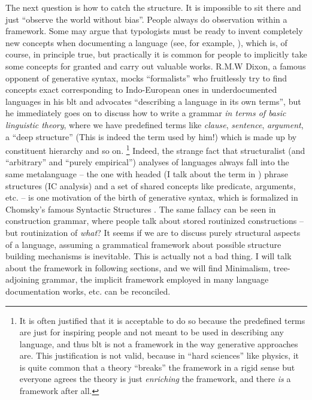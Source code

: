\documentclass[../main.tex]{subfiles}
\begin{document}
The next question is how to catch the structure. It is impossible to sit there and just ``observe the world without bias''. People always do observation within a 
framework. Some may argue that typologists must be ready to invent completely new concepts when documenting 
a language (see, for example, \citet{haspelmath2008framework}), which is, of course, in principle true, 
but practically it is common for people to implicitly take some concepts for granted and carry out 
valuable works. R.M.W Dixon, a famous opponent of generative syntax, mocks ``formalists'' who fruitlessly try 
to find concepts exact corresponding to Indo-European ones in underdocumented languages in his 
\ac{blt} \citep{dixon2009basic} and advocates ``describing a language in its own terms'',
but he immediately goes on to discuss how to write a grammar \emph{in terms of basic linguistic theory},
where we have predefined terms like \emph{clause}, \emph{sentence}, \emph{argument}, a ``deep structure''
(This is indeed the term used by him!) which is made up by constituent hierarchy and so on. %
\footnote{
    It is often justified that it is acceptable to do so because the predefined terms are just for inspiring 
    people and not meant to be used in describing any language, and thus \ac{blt} is not a framework in the way generative approaches are. This justification is not valid, because in 
    ``hard sciences'' like physics, it is quite common that a theory ``breaks'' the framework in a rigid sense 
    but everyone agrees the theory is just \emph{enriching} the framework, and there \emph{is} a framework after all.
}%
Indeed, the strange fact that structuralist (and ``arbitrary'' and ``purely empirical'') analyses of 
languages always fall into the same metalanguage -- the one with headed (I talk about the term in 
) phrase structures (IC analysis) and a set of shared concepts like predicate, 
arguments, etc. -- is one motivation of the birth of generative syntax, which is formalized in Chomsky's 
famous Syntactic Structures \citep{chomsky2009syntactic}. The same fallacy can be seen in construction grammar,
where people talk about stored routinized constructions -- but routinization of \emph{what}? 
It seems if we are to discuss purely structural aspects of a language, assuming a grammatical framework 
about possible structure building mechanisms is inevitable. This is actually not a bad thing. I will 
talk about the framework in following sections, and we will find Minimalism, tree-adjoining
grammar, the implicit framework employed in many language documentation works, etc. can be reconciled.
\end{document}

